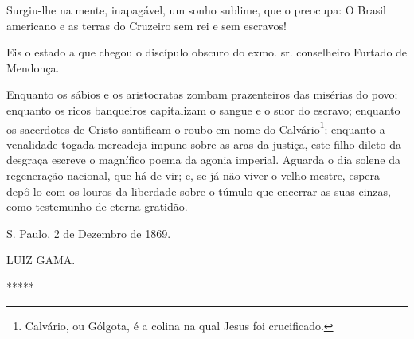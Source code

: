 Surgiu-lhe na mente, inapagável, um sonho sublime, que o preocupa: O
Brasil americano e as terras do Cruzeiro sem rei e sem escravos!

Eis o estado a que chegou o discípulo obscuro do exmo. sr. conselheiro
Furtado de Mendonça.

Enquanto os sábios e os aristocratas zombam prazenteiros das misérias do
povo; enquanto os ricos banqueiros capitalizam o sangue e o suor do
escravo; enquanto os sacerdotes de Cristo santificam o roubo em nome do
Calvário\footnote{Calvário, ou Gólgota, é a colina na qual Jesus foi
  crucificado.}; enquanto a venalidade togada mercadeja impune sobre as
aras da justiça, este filho dileto da desgraça escreve o magnífico poema
da agonia imperial. Aguarda o dia solene da regeneração nacional, que há
de vir; e, se já não viver o velho mestre, espera depô-lo com os louros
da liberdade sobre o túmulo que encerrar as suas cinzas, como testemunho
de eterna gratidão.

S. Paulo, 2 de Dezembro de 1869.

LUIZ GAMA.

*****
